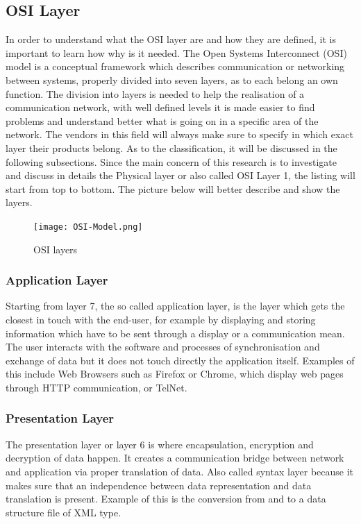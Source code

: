 \documentclass[conference]{IEEEtran}
\begin{document}
\subsection{OSI Layer}
In order to understand what the OSI layer are and how they are defined, it is important to learn how why is it needed. The Open Systems Interconnect (OSI) model is a conceptual framework which describes communication or networking between systems, properly divided into seven layers, as to each belong an own function. The division into layers is needed to help the realisation of a communication network, with well defined levels it is made easier to find problems and understand better what is going on in a specific area of the network. The vendors in this field will always make sure to specify in which exact layer their products belong. As to the classification, it will be discussed in the following subsections.
Since the main concern of this research is to investigate and discuss in details the Physical layer or also called OSI Layer 1, the listing will start from top to bottom. The picture below will better describe and show the layers.
\begin{figure}[htbp]
    \centerline{\texttt{[image: OSI-Model.png]}}
    \caption{OSI layers \cite{b3}}
    \label{osi}
\end{figure}

\subsubsection{Application Layer}
Starting from layer 7, the so called application layer, is the layer which gets the closest in touch with the end-user, for example by displaying and storing information which have to be sent through a display or a communication mean. The user interacts with the software and processes of synchronisation and exchange of data but it does not touch directly the application itself. Examples of this include Web Browsers such as Firefox or Chrome, which display web pages through HTTP communication, or TelNet. 
\subsubsection{Presentation Layer}
The presentation layer or layer 6 is where encapsulation, encryption and decryption of data happen. It creates a communication bridge between network and application via proper translation of data. Also called syntax layer because it makes sure that an independence between data representation and data translation is present. Example of this is the conversion from and to a data structure file of XML type.
\end{document}
